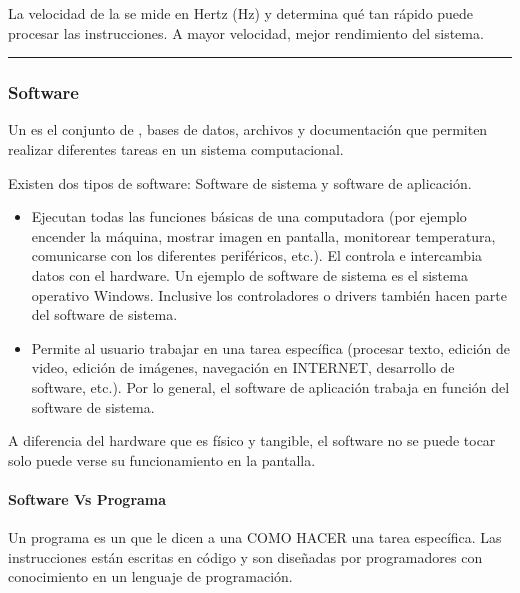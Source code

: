 \documentclass[letterpaper,10pt,spanish]{sphinxmanual}
\begin{document}
\sphinxAtStartPar
La velocidad de la  se mide en Hertz (Hz) y determina qué tan rápido puede procesar las instrucciones. A mayor velocidad, mejor rendimiento del sistema.


\bigskip\hrule\bigskip



\subsubsection{Software}
\label{\detokenize{1_guias/10programacion/G1022:software}}
\sphinxAtStartPar
\sphinxfootnotemark[2] Un  es el conjunto de , bases de datos, archivos y documentación que permiten realizar diferentes tareas en un sistema computacional.

\sphinxAtStartPar
Existen dos tipos de software: Software de sistema y software de aplicación.
\begin{itemize}
\item {} 
\sphinxAtStartPar
{} Ejecutan todas las funciones básicas de una computadora (por ejemplo encender la máquina, mostrar imagen en pantalla, monitorear temperatura, comunicarse con los diferentes periféricos, etc.). El  controla e intercambia datos con el hardware. Un ejemplo de software de sistema es el sistema operativo Windows. Inclusive los controladores o drivers también hacen parte del software de sistema.

\item {} 
\sphinxAtStartPar
{} Permite al usuario trabajar en una tarea específica (procesar texto, edición de video, edición de imágenes, navegación en INTERNET, desarrollo de software, etc.). Por lo general, el software de aplicación trabaja en función del software de sistema.

\end{itemize}

\sphinxAtStartPar
A diferencia del hardware que es físico y tangible, el software no se puede tocar \sphinxhyphen{} solo puede verse su funcionamiento en la pantalla.


\paragraph{Software Vs Programa}
\label{\detokenize{1_guias/10programacion/G1022:software-vs-programa}}
\sphinxAtStartPar
Un programa es un  que le dicen a una  COMO HACER una tarea específica. Las instrucciones están escritas en código y son diseñadas por programadores con conocimiento en un lenguaje de programación.
\end{document}
